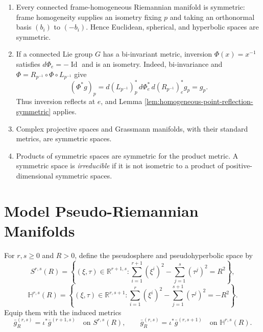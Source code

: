 \begin{example}
\label{ex:riemannian-symmetric-spaces}

\begin{enumerate}[label=(\alph*)]
\item Every connected frame-homogeneous Riemannian manifold is symmetric:
frame homogeneity supplies an isometry fixing $p$ and taking an orthonormal
basis $(b_i)$ to $(-b_i)$. Hence Euclidean, spherical, and hyperbolic spaces are
symmetric.

\item If a connected Lie group $G$ has a bi-invariant metric, inversion
$\Phi(x)=x^{-1}$ satisfies $d\Phi_e=-\operatorname{Id}$ and is an isometry.
Indeed, bi-invariance and
$\Phi=R_{p^{-1}}\circ\Phi\circ L_{p^{-1}}$ give
\[
(\Phi^*g)_p
=d(L_{p^{-1}})_p^*\,d\Phi_e^*\,d(R_{p^{-1}})_e^*g_p=g_p.
\]
Thus inversion reflects at $e$, and Lemma
\ref{lem:homogeneous-point-reflection-symmetric} applies.

\item Complex projective spaces and Grassmann manifolds, with their standard
metrics, are symmetric spaces.

\item Products of symmetric spaces are symmetric for the product metric. A
symmetric space is \emph{irreducible} if it is not isometric to a product of
positive-dimensional symmetric spaces.
\end{enumerate}
\end{example}
\section{Model Pseudo-Riemannian Manifolds}

For $r,s\geq0$ and $R>0$, define the pseudosphere and pseudohyperbolic space by
\[
S^{r,s}(R)=\left\{(\xi,\tau)\in\mathbb R^{r+1,s}:
\sum_{i=1}^{r+1}(\xi^i)^2-\sum_{j=1}^{s}(\tau^j)^2=R^2\right\},
\]
\[
\mathbb H^{r,s}(R)=\left\{(\xi,\tau)\in\mathbb R^{r,s+1}:
\sum_{i=1}^{r}(\xi^i)^2-\sum_{j=1}^{s+1}(\tau^j)^2=-R^2\right\}.
\]
Equip them with the induced metrics
\[
\bar g_R^{(r,s)}=\iota^*\bar g^{(r+1,s)}
\quad\text{on }S^{r,s}(R),
\qquad
\bar g_R^{(r,s)}=\iota^*\bar g^{(r,s+1)}
\quad\text{on }\mathbb H^{r,s}(R).
\]

